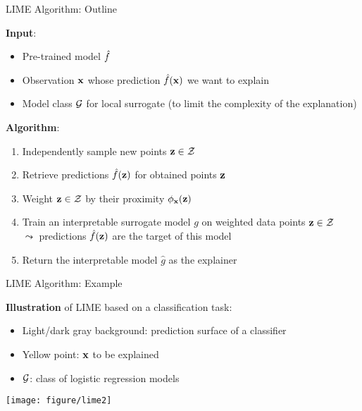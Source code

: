 \documentclass[11pt,compress,t,notes=noshow, aspectratio=169, xcolor=table]{beamer}
\newcommand{\gh}{\hat{g}}
\begin{document}
\begin{frame}[c]{LIME Algorithm: Outline}
		
		\textbf{Input}:
		\begin{itemize}
		    \item Pre-trained model $\hat{f}$
		    \item Observation $\mathbf{x}$ whose prediction $\hat{f}(\mathbf{x})$ we want to explain
		    \item Model class $\mathcal{G}$ for local surrogate (to limit the complexity of the explanation)
		\end{itemize}
		
		\pause
		\medskip
		
		\textbf{Algorithm}:
		\begin{enumerate}
    		\item Independently sample new points $\mathbf{z} \in \mathcal{Z}$ 
    		\item Retrieve predictions $\hat{f}(\mathbf{z})$ for obtained points $\mathbf{z}$ 
    		\item Weight $\mathbf{z} \in \mathcal{Z}$ by their proximity $\phi_{\mathbf{x}}(\mathbf{z})$
    		\item Train an interpretable surrogate model $g$ on weighted data points $\mathbf{z} \in \mathcal{Z}$\\ $\leadsto$ predictions $\hat{f}(\mathbf{z})$ are the target of this model
    		\item Return the interpretable model $\gh$ as the explainer
		\end{enumerate}
		

	
\end{frame} 

\begin{frame}[c]{LIME Algorithm: Example}

    	\textbf{Illustration} of LIME based on a classification task:
		\begin{itemize}
			\item Light/dark gray background: prediction surface of a classifier
			\item Yellow point: $\mathbf{x}$ to be explained
			\item $\mathcal{G}$: class of logistic regression models 
		\end{itemize}
		\begin{center}
			\texttt{[image: figure/lime2]}
		\end{center}

\end{frame} 
\end{document}
